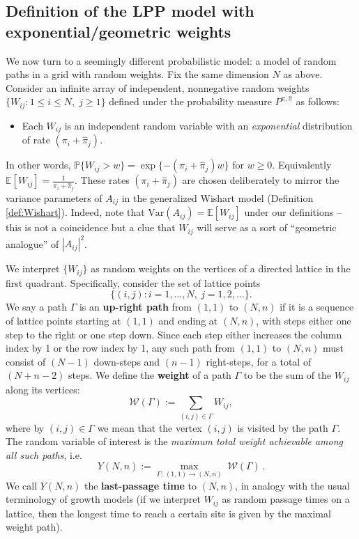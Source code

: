 \documentclass[letterpaper,11pt,oneside,reqno]{article}
\numberwithin{equation}{section}
\theoremstyle{definition}
\begin{document}
\subsection{Definition of the LPP model with exponential/geometric weights}
We now turn to a seemingly different probabilistic model: a model of random paths in a grid with random weights. Fix the same dimension $N$ as above. Consider an infinite array of independent, nonnegative random weights $\{W_{ij}: 1\le i\le N,\; j\ge 1\}$ defined under the probability measure $P^{\pi,\hat\pi}$ as follows:
\begin{itemize}\item Each $W_{ij}$ is an independent random variable with an \emph{exponential} distribution of rate $(\pi_i + \hat\pi_j)$.
\end{itemize}
In other words, $\mathbb{P}\{W_{ij} > w\} = \exp\{-(\pi_i+\hat\pi_j) w\}$ for $w\ge0$. Equivalently $\mathbb{E}[W_{ij}] = \frac{1}{\pi_i+\hat\pi_j}$. These rates $(\pi_i+\hat\pi_j)$ are chosen deliberately to mirror the variance parameters of $A_{ij}$ in the generalized Wishart model (Definition \ref{def:Wishart}). Indeed, note that $\mathrm{Var}(A_{ij}) = \mathbb{E}[W_{ij}]$ under our definitions -- this is not a coincidence but a clue that $W_{ij}$ will serve as a sort of ``geometric analogue'' of $|A_{ij}|^2$.

We interpret $\{W_{ij}\}$ as random weights on the vertices of a directed lattice in the first quadrant. Specifically, consider the set of lattice points
\[ \{(i,j): i=1,\dots,N,\ j=1,2,\dots\}.\]
We say a path $\Gamma$ is an \textbf{up-right path} from $(1,1)$ to $(N,n)$ if it is a sequence of lattice points starting at $(1,1)$ and ending at $(N,n)$, with steps either one step to the right or one step down. Since each step either increases the column index by 1 or the row index by 1, any such path from $(1,1)$ to $(N,n)$ must consist of $(N-1)$ down-steps and $(n-1)$ right-steps, for a total of $(N+n-2)$ steps. We define the \textbf{weight} of a path $\Gamma$ to be the sum of the $W_{ij}$ along its vertices:
\[ \mathcal{W}(\Gamma) := \sum_{(i,j)\in \Gamma} W_{ij}, \]
where by $(i,j)\in \Gamma$ we mean that the vertex $(i,j)$ is visited by the path $\Gamma$. The random variable of interest is the \emph{maximum total weight achievable among all such paths}, i.e.
\begin{equation}\label{eq:LPPdef}
Y(N,n) := \max_{\Gamma:\, (1,1)\to(N,n)} \; \mathcal{W}(\Gamma)\,.
\end{equation}
We call $Y(N,n)$ the \textbf{last-passage time} to $(N,n)$, in analogy with the usual terminology of growth models (if we interpret $W_{ij}$ as random passage times on a lattice, then the longest time to reach a certain site is given by the maximal weight path).
\end{document}
